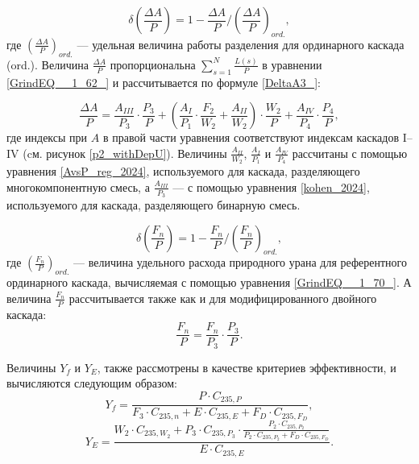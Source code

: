 \begin{equation} \label{DeltaA3} 
    \delta(\frac{\Delta A}{P})=1-\frac{\Delta A}{P}/(\frac{\Delta A}{P})_{ord.},
\end{equation}
где $(\frac{\Delta A}{P})_{ord.}$ --- удельная величина работы разделения для ординарного каскада (ord.). Величина $\frac{\Delta A}{P}$ пропорциональна $\sum _{s=1}^{N}\frac{L(s)}{P}$ в уравнении \ref{GrindEQ__1_62_} и рассчитывается по формуле \ref{DeltaA3_}:

\begin{equation} \label{DeltaA3_} 
\frac{\Delta A}{P} = \frac{A_{III}}{P_3} \cdot \frac{P_3}{P}+(\frac{A_I}{P_1} \cdot \frac{F_2}{W_2}+\frac{A_{II}}{W_2}) \cdot \frac{W_2}{P} + \frac{A_{IV}}{P_4} \cdot \frac{P_4}{P},
\end{equation}
где индексы при $A$ в правой части уравнения соответствуют индексам каскадов I--IV (cм. рисунок \ref{p2_withDepU}). Величины $\frac{A_{II}}{W_2}$, $\frac{A_I}{P_1}$ и $\frac{A_{IV}}{P_4}$ рассчитаны с помощью уравнения \ref{AvsP_reg_2024}, используемого для каскада, разделяющего многокомпонентную смесь, а $\frac{A_{III}}{P_3}$ --- с помощью уравнения \ref{kohen_2024}, используемого для каскада, разделяющего бинарную смесь.

\begin{equation} \label{DeltaFnu3} 
\delta(\frac{F_n}{P})=1-\frac{F_n}{P}/(\frac{F_n}{P})_{ord.},
\end{equation} 
где $(\frac{F_n}{P})_{ord.}$ --- величина удельного расхода природного урана для референтного ординарного каскада, вычисляемая с помощью уравнения \ref{GrindEQ__1_70_}. А величина $\frac{F_n}{P}$ рассчитывается также как и для модифицированного двойного каскада:
\begin{equation} \label{Delta_Fnu}
    \frac{F_n}{P} = \frac{F_n}{P_3} \cdot \frac{P_3}{P}.
\end{equation}

Величины $Y_f$ и $Y_{E}$, также рассмотрены в качестве критериев эффективности, и вычисляются следующим образом:
\begin{equation} \label{Rec3} 
    Y_{f} = \frac{P \cdot C_{235,P}}{F_3 \cdot C_{235,n} + E \cdot C_{235,E} + F_D \cdot C_{235,F_D}},
\end{equation} 
\begin{equation} \label{RecR3} 
    Y_{E} = \frac{W_2\cdot C_{235,W_2} + P_3 \cdot C_{235,P_3} \cdot \frac{P_2\cdot C_{235,P_2}}{P_2\cdot C_{235,P_2}+ F_D \cdot C_{235,F_D}}}{E \cdot C_{235,E}}   .     
\end{equation} 


